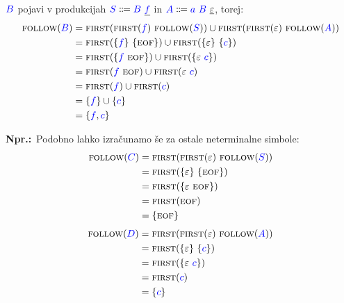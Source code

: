 \documentclass{article}
\newcommand{\Ex}{\textbf{Npr.:}\ }
\newcommand{\FIRST}{\textsc{first}}
\newcommand{\FOLLOW}{\textsc{follow}}
\newcommand{\EOF}{\textsc{eof}}
\newcommand{\Symbol}[1]{\textcolor{blue}{#1}}
\newcommand{\Null}{\varepsilon}
\newcommand{\Arrow}{\Coloneq}
\newcommand{\Seq}{\ }
\begin{document}
$\Symbol{B}$ pojavi v produkcijah $\Symbol{S} \Arrow \Symbol{B} \Seq \underline{\Symbol{f}}$ in $\Symbol{A} \Arrow \Symbol{a} \Seq \Symbol{B} \Seq \underline{\Null}$, torej:
\begin{align*}
  \FOLLOW(\Symbol{B}) &= \FIRST(\FIRST(\Symbol{f}) \Seq \FOLLOW(\Symbol{S})) \cup \FIRST(\FIRST(\Null) \Seq \FOLLOW(\Symbol{A})) \\
             &= \FIRST(\{\Symbol{f}\} \Seq \{\EOF\}) \cup \FIRST(\{\Null\} \Seq \{\Symbol{c}\}) \\
             &= \FIRST(\{\Symbol{f} \Seq \EOF\}) \cup \FIRST(\{\Null \Seq \Symbol{c}\}) \\
             &= \FIRST(\Symbol{f} \Seq \EOF) \cup \FIRST(\Null \Seq \Symbol{c}) \\
             &= \FIRST(\Symbol{f}) \cup \FIRST(\Symbol{c})\\
             &= \{\Symbol{f}\} \cup \{\Symbol{c}\}\\
             &= \{\Symbol{f}, \Symbol{c}\}
\end{align*}


\Ex Podobno lahko izračunamo še za ostale neterminalne simbole:
\begin{align*}
  \FOLLOW(\Symbol{C}) &= \FIRST(\FIRST(\Null) \Seq \FOLLOW(\Symbol{S})) \\
             &= \FIRST(\{\Null\} \Seq \{\EOF\})\\
             &= \FIRST(\{\Null \Seq \EOF\})\\
             &= \FIRST(\EOF) \\
             &= \{\EOF\}
\end{align*}
\begin{align*}
  \FOLLOW(\Symbol{D}) &= \FIRST(\FIRST(\Null) \Seq \FOLLOW(\Symbol{A})) \\
             &= \FIRST(\{\Null\} \Seq \{\Symbol{c}\})\\
             &= \FIRST(\{\Null \Seq \Symbol{c}\})\\
             &= \FIRST(\Symbol{c}) \\
             &= \{\Symbol{c}\}
\end{align*}
\end{document}
